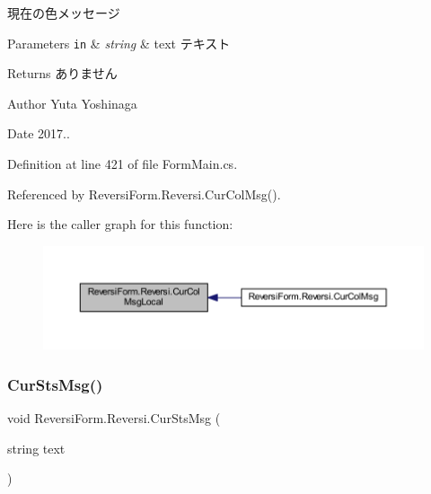 現在の色メッセージ 


\begin{DoxyParams}[1]{Parameters}
\mbox{\tt in}  & {\em string} & text テキスト \\
\hline
\end{DoxyParams}
\begin{DoxyReturn}{Returns}
ありません 
\end{DoxyReturn}
\begin{DoxyAuthor}{Author}
Yuta Yoshinaga 
\end{DoxyAuthor}
\begin{DoxyDate}{Date}
2017.. 
\end{DoxyDate}


Definition at line 421 of file Form\+Main.\+cs.



Referenced by Reversi\+Form.\+Reversi.\+Cur\+Col\+Msg().

Here is the caller graph for this function\+:
\nopagebreak
\begin{figure}[H]
\begin{center}
\leavevmode
\includegraphics[width=350pt]{class_reversi_form_1_1_reversi_a0d919be21fe5961a177e26b5752320b9_icgraph}
\end{center}
\end{figure}
\mbox{\label{class_reversi_form_1_1_reversi_af5009aa7b1b255b9dec7028d8a7c53f7}} 
\subsubsection{\texorpdfstring{Cur\+Sts\+Msg()}{CurStsMsg()}}
{\footnotesize\ttfamily void Reversi\+Form.\+Reversi.\+Cur\+Sts\+Msg (\begin{DoxyParamCaption}\item[{string}]{text }\end{DoxyParamCaption})}




